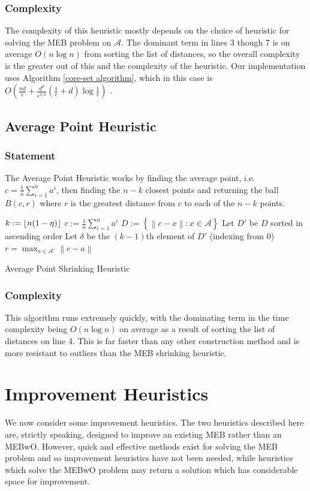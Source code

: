\documentclass[11pt,twoside]{report}
\newcommand{\A}{\mathcal{A}} %
\newcommand{\norm}[1]{\left\lVert#1\right\rVert} %
\DeclarePairedDelimiter\floor{\lfloor}{\rfloor}
\theoremstyle{definition}
\numberwithin{theorem}{section}
\numberwithin{definition}{section}
\numberwithin{lemma}{section}
\numberwithin{proposition}{section}
\numberwithin{equation}{section}
\numberwithin{figure}{section}
\begin{document}
\subsubsection{Complexity}
The complexity of this heuristic mostly depends on the choice of heuristic for solving the MEB problem on $\A$. The dominant term in lines 3 though 7 is on average $O(n\log n)$ from sorting the list of distances, so the overall complexity is the greater out of this and the complexity of the heuristic. Our implementation uses Algorithm \ref{core-set algorithm}, which in this case is $O\left(\frac{nd}{\epsilon}+\frac{d^2}{\epsilon^{3/2}}\left(\frac{1}{\epsilon}+d\right)\log\frac{1}{\epsilon}\right)$ \cite[Page 6]{core-sets}.
\subsection{Average Point Heuristic}
\subsubsection{Statement}
The Average Point Heuristic works by finding the average point, i.e. $c=\frac{1}{n}\sum_{i=1}^n a^i$, then finding the $n-k$ closest points and returning the ball $B(c,r)$ where $r$ is the greatest distance from $c$ to each of the $n-k$ points.

\begin{algorithm}[H]\label{avg point shrink}
    \SetAlgoLined
    \KwIn{Data set $\A$, $\eta\in[0,1]$}
    $k:=\floor{n(1-\eta)}$\;
    $c:=\frac{1}{n}\sum_{i=1}^na^i$\;
    $D:=\left\{\norm{c-x}: x\in\A\right\}$\;
    Let $D'$ be $D$ sorted in ascending order\;
    Let $\delta$ be the $(k-1)$th element of $D'$ (indexing from 0)\;
    $r = \max_{a\in\A'}\norm{c-a}$\;
    
    \caption{Average Point Shrinking Heuristic}
\end{algorithm}

\subsubsection{Complexity}
This algorithm runs extremely quickly, with the dominating term in the time complexity being $O(n\log n)$ on average as a result of sorting the list of distances on line 4. This is far faster than any other construction method and is more resistant to outliers than the MEB shrinking heuristic.



\section{Improvement Heuristics}
We now consider some improvement heuristics. The two heuristics described here are, strictly speaking, designed to improve an existing MEB rather than an MEBwO. However, quick and effective methods exist for solving the MEB problem and so improvement heuristics have not been needed, while heuristics which solve the MEBwO problem may return a solution which has considerable space for improvement.
\end{document}
